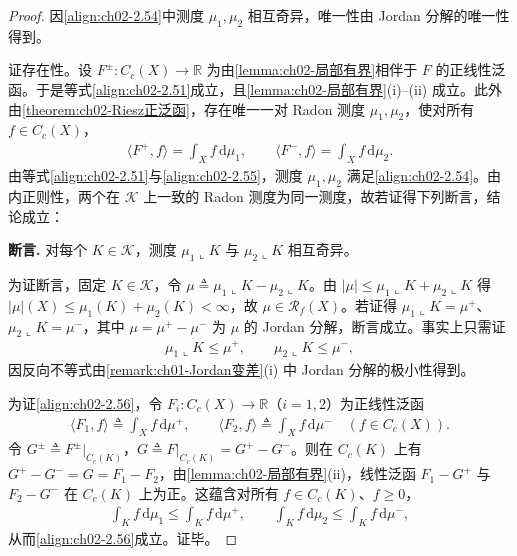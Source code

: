\documentclass[../../main.tex]{subfiles}%
\begin{document}
\begin{proof}
因\eqref{align:ch02-2.54}中测度 $\mu_1,\mu_2$ 相互奇异，唯一性由 Jordan 分解的唯一性得到。

证存在性。设 $F^\pm:C_c(X)\to\mathbb R$ 为由\cref{lemma:ch02-局部有界}相伴于 $F$ 的正线性泛函。于是等式\eqref{align:ch02-2.51}成立，且\cref{lemma:ch02-局部有界}(i)--(ii) 成立。此外由\cref{theorem:ch02-Riesz正泛函}，存在唯一一对 Radon 测度 $\mu_1,\mu_2$，使对所有 $f\in C_c(X)$，
\begin{align}
\langle F^+,f\rangle=\int_X f\,\mathrm{d}\mu_1,\qquad
\langle F^-,f\rangle=\int_X f\,\mathrm{d}\mu_2. \label{align:ch02-2.55}
\end{align}
由等式\eqref{align:ch02-2.51}与\eqref{align:ch02-2.55}，测度 $\mu_1,\mu_2$ 满足\eqref{align:ch02-2.54}。由内正则性，两个在 $\mathscr K$ 上一致的 Radon 测度为同一测度，故若证得下列断言，结论成立：

\textbf{断言.} 对每个 $K\in\mathscr K$，测度 $\mu_1\llcorner K$ 与 $\mu_2\llcorner K$ 相互奇异。

为证断言，固定 $K\in\mathscr K$，令 $\mu\triangleq \mu_1\llcorner K-\mu_2\llcorner K$。由 $|\mu|\leqslant\mu_1\llcorner K+\mu_2\llcorner K$ 得 $|\mu|(X)\leqslant\mu_1(K)+\mu_2(K)<\infty$，故 $\mu\in\mathscr R_f(X)$。若证得 $\mu_1\llcorner K=\mu^+$、$\mu_2\llcorner K=\mu^-$，其中 $\mu=\mu^+-\mu^-$ 为 $\mu$ 的 Jordan 分解，断言成立。事实上只需证
\begin{align}
\mu_1\llcorner K\leqslant\mu^+,\qquad\mu_2\llcorner K\leqslant\mu^-, \label{align:ch02-2.56}
\end{align}
因反向不等式由\cref{remark:ch01-Jordan变差}(i) 中 Jordan 分解的极小性得到。

为证\eqref{align:ch02-2.56}，令 $F_i:C_c(X)\to\mathbb R$（$i=1,2$）为正线性泛函
\begin{align*}
\langle F_1,f\rangle\triangleq \int_X f\,\mathrm{d}\mu^+,\qquad
\langle F_2,f\rangle\triangleq \int_X f\,\mathrm{d}\mu^-\quad(f\in C_c(X)).
\end{align*}
令 $G^\pm\triangleq F^\pm|_{C_c(K)}$，$G\triangleq F|_{C_c(K)}=G^+-G^-$。则在 $C_c(K)$ 上有 $G^+-G^-=G=F_1-F_2$，由\cref{lemma:ch02-局部有界}(ii)，线性泛函 $F_1-G^+$ 与 $F_2-G^-$ 在 $C_c(K)$ 上为正。这蕴含对所有 $f\in C_c(K)$、$f\geqslant0$，
\begin{align*}
\int_K f\,\mathrm{d}\mu_1\leqslant\int_K f\,\mathrm{d}\mu^+,\qquad
\int_K f\,\mathrm{d}\mu_2\leqslant\int_K f\,\mathrm{d}\mu^-,
\end{align*}
从而\eqref{align:ch02-2.56}成立。证毕。
\end{proof}
\end{document}
